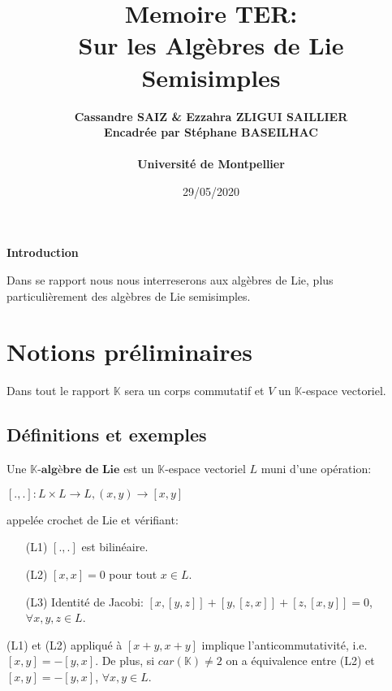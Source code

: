 \documentclass[a4paper,openany,12pt]{report}
\title{\textbf{Memoire TER: \\ Sur les Algèbres de Lie Semisimples}}
\author{\bf Cassandre SAIZ \& Ezzahra ZLIGUI SAILLIER \\ \bf Encadrée par Stéphane BASEILHAC \\ \\Université de Montpellier}
\date{29/05/2020}
\newcommand{\KK}{\mathbb{K}}
\theoremstyle{break}
{\theorembodyfont{\upshape}
\newtheorem*{rmq}{Remarque :}
\newtheorem*{prv}{Preuve :}
\newtheorem*{ex}{Exemples :}
\newtheorem*{exe}{Exemple : }
\newtheorem*{nota}{Notation :}
\newtheorem*{dem}{D\'emonstration :}}
\begin{document}
 

\maketitle
\thispagestyle{fancy}
\newpage
\vspace{4mm}
\clearpage
\tableofcontents
\clearpage

\begin{center}
\huge{\vspace*{2cm}\textbf{Introduction}}
\end{center}

\quad Dans se rapport nous nous interreserons aux algèbres de Lie, plus particulièrement des algèbres de Lie semisimples.

\vspace*{2cm}
    \newpage 



\chapter{Notions préliminaires }
Dans tout le rapport $\KK$ sera un corps commutatif et $V$ un $\KK$-espace vectoriel.

\section{Définitions et exemples}
\begin{df}
\quad Une $\KK \textbf{-algèbre de Lie}$ est un $\KK$-espace vectoriel $L$ muni d'une opération:
\begin{center}
$[. , . ]: L\times L\to  L,$\quad$(x,y) \to [x,y] $ 
\end{center}
appelée crochet de Lie et vérifiant: 
\begin{center}
\begin{itemize}
\item[(L1)] $[.,.]$ est bilinéaire.
\item[(L2)] $[x,x]=0$ pour tout $ x \in L $.
\item[(L3)] Identité de Jacobi:\quad
$[x,[y,z]]+[y,[z,x]]+[z,[x,y]]=0$, $\forall x,y,z \in L$.
\end{itemize}
\end{center}
\end{df}

\begin{rmq}
\quad (L1) et (L2) appliqué à $[x+y,x+y]$ implique l’anticommutativité, i.e. $[x,y]=-[y,x]$. De plus, si $car(\KK) \ne 2$ on a équivalence entre (L2) et $[x,y]=-[y,x]$, $\forall x,y \in L$.
\end{rmq}
\end{document}
